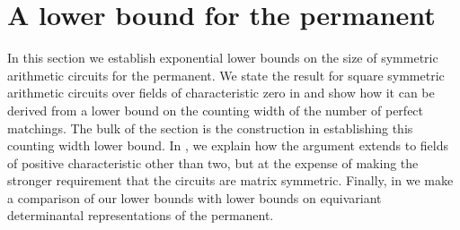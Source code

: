 \documentclass{toc}
\begin{document}
\section{A lower bound for the permanent} %
\label{sec:permanent}
In this section we establish exponential lower bounds on the size of symmetric
arithmetic circuits for the permanent.  We state the result for square
symmetric arithmetic circuits over fields of characteristic zero in
 and show how it can be derived from a
lower bound on the counting width of the number of perfect matchings.
The bulk of the section is the construction in
 establishing this counting width lower
bound.  In ,  we explain how the
argument extends to fields of positive characteristic other than two,
but at the expense of making the stronger requirement that the
circuits are matrix symmetric.  Finally, in
 we make a comparison of our lower bounds
with lower bounds on equivariant determinantal representations of the permanent.
\end{document}
